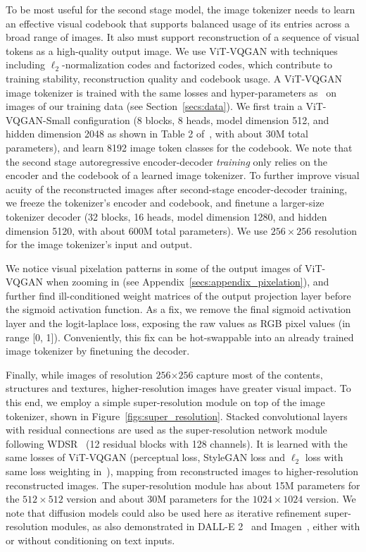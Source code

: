 To be most useful for the second stage model, the image tokenizer needs to learn an effective visual codebook that supports balanced usage of its entries across a broad range of images. It also must support reconstruction of a sequence of visual tokens as a high-quality output image. We use ViT-VQGAN \cite{yu2021vector} with techniques including \(\ell_2\)-normalization codes and factorized codes, which contribute to training stability, reconstruction quality and codebook usage. A ViT-VQGAN image tokenizer is trained with the same losses and hyper-parameters as~\cite{yu2021vector} on images of our training data (see Section~\ref{secs:data}). We first train a ViT-VQGAN-Small configuration (8 blocks, 8 heads, model dimension 512, and hidden dimension 2048 as shown in Table 2 of~\cite{yu2021vector}, with about 30M total parameters), and learn 8192 image token classes for the codebook. We note that the second stage autoregressive encoder-decoder \textit{training} only relies on the encoder and the codebook of a learned image tokenizer. To further improve visual acuity of the reconstructed images after second-stage encoder-decoder training, we freeze the tokenizer's encoder and codebook, and finetune a larger-size tokenizer decoder (32 blocks, 16 heads, model dimension 1280, and hidden dimension 5120, with about 600M total parameters). We use \(256{\times}256\) resolution for the image tokenizer's input and output.

We notice visual pixelation patterns in some of the output images of ViT-VQGAN when zooming in (see Appendix~\ref{secs:appendix_pixelation}), and further find ill-conditioned weight matrices of the output projection layer before the sigmoid activation function. As a fix, we remove the final sigmoid activation layer and the logit-laplace loss, exposing the raw values as RGB pixel values (in range [0, 1]). Conveniently, this fix can be hot-swappable into an already trained image tokenizer by finetuning the decoder.

Finally, while images of resolution \(256{\times256}\) capture most of the contents, structures and textures, higher-resolution images have greater visual impact. To this end, we employ a simple super-resolution module on top of the image tokenizer, shown in Figure~\ref{figs:super_resolution}. Stacked convolutional layers with residual connections are used as the super-resolution network module following WDSR~\cite{yu2018wide} (12 residual blocks with 128 channels). It is learned with the same losses of ViT-VQGAN (perceptual loss, StyleGAN loss and \(\ell_2\) loss with same loss weighting in~\cite{yu2021vector}), mapping from reconstructed images to higher-resolution reconstructed images. The super-resolution module has about 15M parameters for the \(512{\times}512\) version and about 30M parameters for the \(1024{\times}1024\) version. We note that diffusion models could also be used here as iterative refinement super-resolution modules, as also demonstrated in DALL-E 2~\cite{ramesh2022hierarchical} and Imagen~\cite{imagen}, either with or without conditioning on text inputs.



